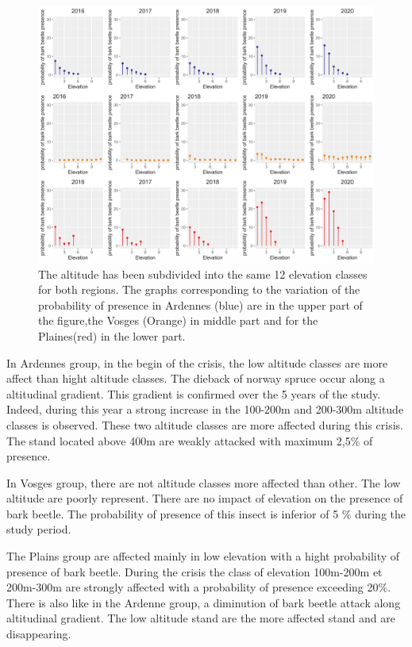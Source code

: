 \documentclass[3p,procedia]{elsarticle}
\begin{document}
\begin{figure}
\centering
	\includegraphics[width=\textwidth]{synthese_color_06_2022.png}
     \caption{The altitude has been subdivided into the same 12 elevation classes for both regions. 
The graphs corresponding to the variation of the probability of presence in Ardennes (blue) are in the upper part of the figure,the Vosges (Orange) in middle part and for the Plaines(red) in the lower part.
}
	\label{alti_sco}
\end{figure}

In Ardennes group, in the begin of the crisis, the low altitude classes are more affect than hight altitude classes.
The dieback of norway spruce occur along a altitudinal  gradient.
This gradient is confirmed over the 5 years of the study.
Indeed, during this year a strong increase in the 100-200m and 200-300m altitude classes is observed. 
These two altitude classes are more affected during this crisis.
The stand located above 400m are weakly attacked with maximum 2,5\% of presence.


In Vosges group, there are not altitude classes more affected than other. 
The low altitude are poorly represent. There are no impact of elevation on the presence of bark beetle. 
The probability of presence of this insect is inferior of 5 \% during the study period.


The Plains group are affected mainly in low elevation with a hight probability of presence of bark beetle. 
During the crisis the class of elevation 100m-200m et 200m-300m are strongly affected with a probability of presence exceeding 20\%.
There is also like in the Ardenne group, a diminution of bark beetle attack along altitudinal gradient.
The low altitude stand are the more affected stand and are disappearing.
\end{document}
